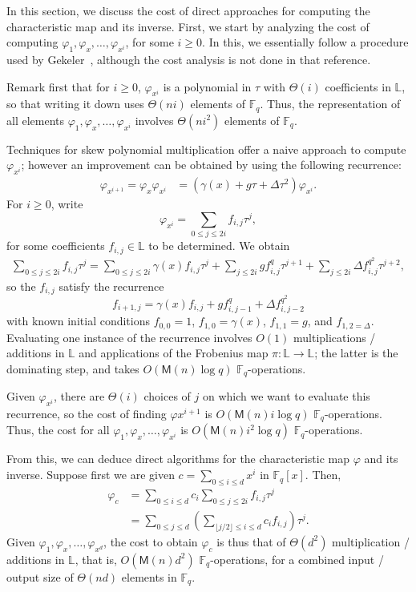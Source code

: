 \documentclass[sigconf]{acmart}
\newcommand{\M}{\mathsf{M}}
\newcommand{\F}{\mathbb{F}}
\renewcommand{\L}{\mathbb{L}}
\begin{document}
In this section, we discuss the cost of direct approaches for
computing the characteristic map and its inverse. First, we start by
analyzing the cost of computing $\varphi_1,\varphi_x,\dots,\varphi_{x^i}$, for
some $i \ge 0$. In this, we essentially follow a procedure used by
Gekeler~\cite[Section~3]{frobdist}, although the cost analysis is not
done in that reference.

Remark first that for $i\ge 0$, $\varphi_{x^i}$ is a polynomial in $\tau$
with $\Theta(i)$ coefficients in $\L$, so that writing it down uses
$\Theta(ni)$ elements of $\F_q$. Thus, the representation of all
elements $\varphi_1,\varphi_x,\dots,\varphi_{x^i}$ involves $\Theta(n i^2)$
elements of $\F_q$.

Techniques for skew polynomial multiplication offer a naive approach
to compute $\varphi_{x^i}$; however an improvement can be obtained by
using the following recurrence:
\begin{align*}
 \varphi_{x^{i+1}} = \varphi_x \varphi_{x^i} & = (\gamma(x) + g\tau + \Delta \tau^2) \varphi_{x^i}.
\end{align*}
For $i \ge 0$, write 
\[\varphi_{x^i}  = \sum_{0 \le j \leq 2i} f_{i,j} \tau^{j},\]
for some coefficients $f_{i,j} \in \L$ to be determined. We obtain
\begin{align*}
 \sum_{0 \le j \leq 2i} f_{i,j} \tau^{j} = \sum_{0 \le j \leq 2i} \gamma(x) f_{i,j} \tau^{j} + \sum_{j \leq 2i} g f_{i,j}^q \tau^{j+1} + \sum_{j \leq 2i} \Delta f_{i,j}^{q^2} \tau^{j+2},
\end{align*}
so the $f_{i,j}$ satisfy the recurrence
\[ f_{i+1,j} = \gamma(x) f_{i,j} + g f_{i,j-1}^q + \Delta f_{i,j-2}^{q^2}\]
with known initial conditions $f_{0,0} = 1$, $f_{1,0} = \gamma(x)$,
$f_{1,1} = g$, and $f_{1,2 = \Delta}$. Evaluating one instance of the
recurrence involves $O(1)$ multiplications / additions in $\L$ and
applications of the Frobenius map $\pi: \L\to \L$; the latter is the
dominating step, and takes $O(\M(n) \log q)$ $\F_q$-operations. 

Given $\varphi_{x^i}$, there are $\Theta(i)$ choices of $j$ on which we
want to evaluate this recurrence, so the cost of finding
$\varphi{x^{i+1}}$ is $O(\M(n) i \log q)$ $\F_q$-operations. Thus, the
cost for all $\varphi_1,\varphi_x,\dots,\varphi_{x^i}$ is $O(\M(n) i^2 \log q)$
$\F_q$-operations.

From this, we can deduce direct algorithms for the characteristic map
$\varphi$ and its inverse. Suppose first we are given $c=\sum_{0 \le i
  \le d} x^i $ in $\F_q[x]$. Then, 
\begin{align}\label{eq:phic}
\varphi_c &= \sum_{0 \le i \le d} c_i \sum_{0 \le j \le 2i} f_{i,j} \tau^j \nonumber \\ 
&= \sum_{0 \le j \le d}  \left (\sum_{\lfloor j/2\rfloor \le i \le d} c_i f_{i,j} \right) \tau^j.
\end{align}
Given $\varphi_1,\varphi_x,\dots,\varphi_{x^d}$, the cost to obtain $\varphi_c$ is
thus that of $\Theta(d^2)$ multiplication / additions in $\L$, that
is, $O(\M(n) d^2)$ $\F_q$-operations, for a combined input / output size of
$\Theta(nd)$ elements in $\F_q$.
\end{document}
